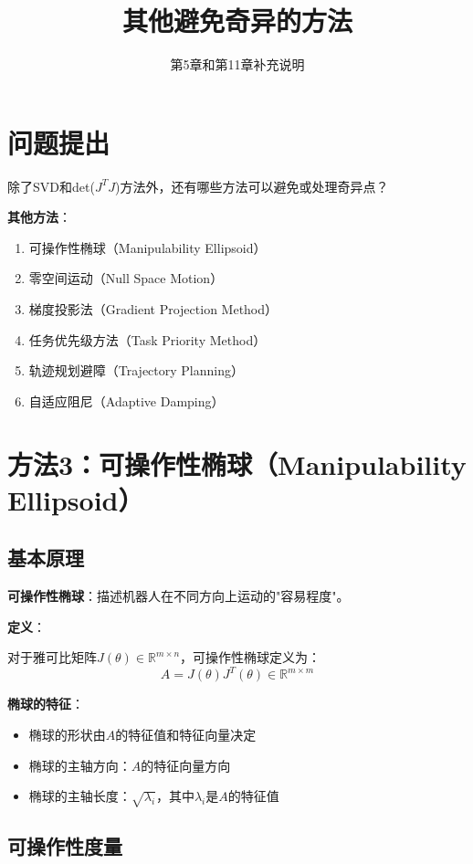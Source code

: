 \documentclass[12pt,a4paper]{article}
\title{其他避免奇异的方法}
\author{第5章和第11章补充说明}
\date{}
\begin{document}
\maketitle

\section{问题提出}

除了SVD和det($J^T J$)方法外，还有哪些方法可以避免或处理奇异点？

\textbf{其他方法}：
\begin{enumerate}
\item 可操作性椭球（Manipulability Ellipsoid）
\item 零空间运动（Null Space Motion）
\item 梯度投影法（Gradient Projection Method）
\item 任务优先级方法（Task Priority Method）
\item 轨迹规划避障（Trajectory Planning）
\item 自适应阻尼（Adaptive Damping）
\end{enumerate}

\section{方法3：可操作性椭球（Manipulability Ellipsoid）}

\subsection{基本原理}

\textbf{可操作性椭球}：描述机器人在不同方向上运动的"容易程度"。

\textbf{定义}：

对于雅可比矩阵$J(\theta) \in \mathbb{R}^{m \times n}$，可操作性椭球定义为：
\begin{equation}
A = J(\theta)J^T(\theta) \in \mathbb{R}^{m \times m}
\end{equation}

\textbf{椭球的特征}：
\begin{itemize}
\item 椭球的形状由$A$的特征值和特征向量决定
\item 椭球的主轴方向：$A$的特征向量方向
\item 椭球的主轴长度：$\sqrt{\lambda_i}$，其中$\lambda_i$是$A$的特征值
\end{itemize}

\subsection{可操作性度量}
\end{document}
